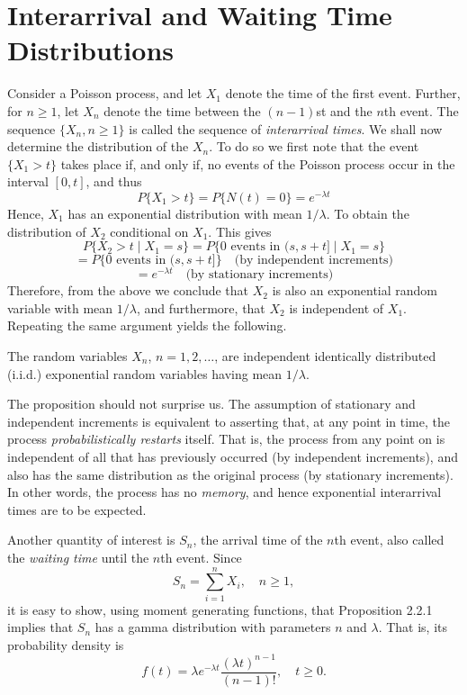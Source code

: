 \documentclass[lang=cn,10pt,thmcnt=section]{elegantbook}
\begin{document}
\section{Interarrival and Waiting Time Distributions}
Consider a Poisson process, and let $X_1$ denote the time of the first event. Further, for $n \geq 1$, let $X_n$ denote the time between the $(n-1)$st and the $n$th event. The sequence $\{X_n, n \geq 1\}$ is called the sequence of \textit{interarrival times}. We shall now determine the distribution of the $X_n$. To do so we first note that the event $\{X_1 > t\}$ takes place if, and only if, no events of the Poisson process occur in the interval $[0, t]$, and thus
\[
P\{X_1 > t\} = P\{N(t) = 0\} = e^{-\lambda t}
\]
Hence, $X_1$ has an exponential distribution with mean $1/\lambda$. To obtain the distribution of $X_2$ conditional on $X_1$. This gives
\[
P\{X_2 > t \mid X_1 = s\} = P\{0 \text{ events in } (s, s+t] \mid X_1 = s\}
\]
\[
= P\{0 \text{ events in } (s, s+t]\} \quad \text{(by independent increments)}
\]
\[
= e^{-\lambda t} \quad \text{(by stationary increments)}
\]
Therefore, from the above we conclude that $X_2$ is also an exponential random variable with mean $1/\lambda$, and furthermore, that $X_2$ is independent of $X_1$. Repeating the same argument yields the following.
\begin{proposition}
	The random variables \(X_n\), \(n = 1, 2, \ldots\), are independent identically distributed (i.i.d.) exponential random variables having mean \(1/\lambda\).
\end{proposition}

\begin{remark}
	The proposition should not surprise us. The assumption of stationary and independent increments is equivalent to asserting that, at any point in time, the process \textit{probabilistically restarts} itself. That is, the process from any point on is independent of all that has previously occurred (by independent increments), and also has the same distribution as the original process (by stationary increments). In other words, the process has no \textit{memory}, and hence exponential interarrival times are to be expected.
\end{remark}

Another quantity of interest is \( S_n \), the arrival time of the \( n \)th event, also called the \textit{waiting time} until the \( n \)th event. Since
\[
S_n = \sum_{i=1}^{n} X_i, \quad n \geq 1,
\]
it is easy to show, using moment generating functions, that Proposition 2.2.1 implies that \( S_n \) has a gamma distribution with parameters \( n \) and \( \lambda \). That is, its probability density is
\[
f(t) = \lambda e^{-\lambda t} \frac{(\lambda t)^{n-1}}{(n-1)!}, \quad t \geq 0.
\]
\end{document}
